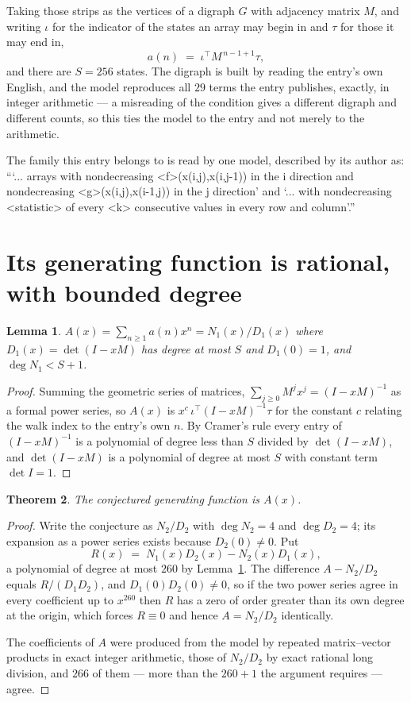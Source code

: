 \documentclass[11pt,a4paper]{article}
\theoremstyle{plain}
\newtheorem{theorem}{Theorem}
\newtheorem{lemma}[theorem]{Lemma}
\theoremstyle{definition}
\begin{document}
Taking those strips as the vertices of a digraph $G$ with adjacency matrix $M$, and writing
$\iota$ for the indicator of the states an array may begin in and $\tau$ for those it may end
in,
\[
a(n)\;=\;\iota^{\!\top}M^{\,n-1+1}\tau ,
\]
and there are $S=256$ states. The digraph is built by reading the entry's own English, and the
model reproduces all $29$ terms the entry publishes, exactly, in integer arithmetic --- a
misreading of the condition gives a different digraph and different counts, so this ties the
model to the entry and not merely to the arithmetic.

The family this entry belongs to is read by one model, described by its author as: ```... arrays with nondecreasing <f>(x(i,j),x(i,j-1)) in the i direction and nondecreasing <g>(x(i,j),x(i-1,j)) in the j direction' and `... with nondecreasing <statistic> of every <k> consecutive values in every row and column'.''


\section{Its generating function is rational, with bounded degree}

\begin{lemma}\label{lem:rat}
$A(x)=\sum_{n\ge1}a(n)x^n=N_1(x)/D_1(x)$ where $D_1(x)=\det(I-xM)$ has degree at most
$S$ and $D_1(0)=1$, and $\deg N_1<S+1$.
\end{lemma}

\begin{proof}
Summing the geometric series of matrices, $\sum_{j\ge0}M^jx^j=(I-xM)^{-1}$ as a formal
power series, so $A(x)$ is $x^{c}\,\iota^{\!\top}(I-xM)^{-1}\tau$ for the constant $c$
relating the walk index to the entry's own $n$. By Cramer's rule every entry of
$(I-xM)^{-1}$ is a polynomial of degree less than $S$ divided by $\det(I-xM)$, and
$\det(I-xM)$ is a polynomial of degree at most $S$ with constant term $\det I=1$.
\end{proof}

\begin{theorem}
The conjectured generating function is $A(x)$.
\end{theorem}

\begin{proof}
Write the conjecture as $N_2/D_2$ with $\deg N_2=4$ and $\deg D_2=4$; its expansion as a
power series exists because $D_2(0)\neq0$. Put
\[
R(x)\;=\;N_1(x)D_2(x)-N_2(x)D_1(x),
\]
a polynomial of degree at most $260$ by Lemma~\ref{lem:rat}. The difference
$A-N_2/D_2$ equals $R/(D_1D_2)$, and $D_1(0)D_2(0)\neq0$, so if the two power series agree in
every coefficient up to $x^{260}$ then $R$ has a zero of order greater than its own
degree at the origin, which forces $R\equiv0$ and hence $A=N_2/D_2$ identically.

The coefficients of $A$ were produced from the model by repeated matrix--vector products in
exact integer arithmetic, those of $N_2/D_2$ by exact rational long division, and $266$
of them --- more than the $260+1$ the argument requires --- agree.
\end{proof}
\end{document}
